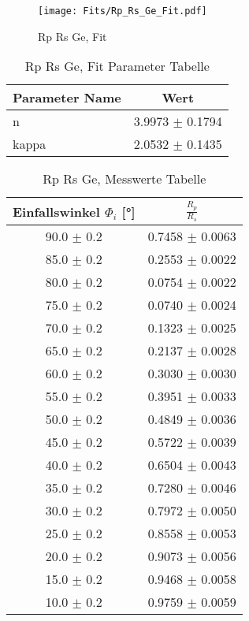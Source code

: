 \begin{figure}[ht] 
 	\centering 
 	\texttt{[image: Fits/Rp\_Rs\_Ge\_Fit.pdf]} 
	\caption{Rp Rs Ge, Fit} 
 	\label{fig:Rp Rs Ge, Fit} 
\end{figure}
 
\begin{table}[ht] 
	\centering 
	\caption{Rp Rs Ge, Fit Parameter Tabelle} 
	\label{tab: Rp Rs Ge, Fit Parameter Tabelle}
	\begin{tabular}{|l|c|}
		\hline
		Parameter Name	&	Wert \\ \hline
		n	&	 3.9973 $\pm$  0.1794\\ \hline
		kappa	&	 2.0532 $\pm$  0.1435\\ \hline
	\end{tabular} 
\end{table}
 
\begin{table}[ht] 
	\centering 
	\caption{Rp Rs Ge, Messwerte Tabelle} 
	\label{tab: Rp Rs Ge, Messwerte Tabelle}
	\begin{tabular}{|c|c|}
		\hline
		Einfallswinkel $\Phi_i$ [°] 	&	 $\frac{R_p}{R_s}$\\ \hline
		90.0 $\pm$ 0.2 	&	 0.7458 $\pm$ 0.0063 \\ \hline
		85.0 $\pm$ 0.2 	&	 0.2553 $\pm$ 0.0022 \\ \hline
		80.0 $\pm$ 0.2 	&	 0.0754 $\pm$ 0.0022 \\ \hline
		75.0 $\pm$ 0.2 	&	 0.0740 $\pm$ 0.0024 \\ \hline
		70.0 $\pm$ 0.2 	&	 0.1323 $\pm$ 0.0025 \\ \hline
		65.0 $\pm$ 0.2 	&	 0.2137 $\pm$ 0.0028 \\ \hline
		60.0 $\pm$ 0.2 	&	 0.3030 $\pm$ 0.0030 \\ \hline
		55.0 $\pm$ 0.2 	&	 0.3951 $\pm$ 0.0033 \\ \hline
		50.0 $\pm$ 0.2 	&	 0.4849 $\pm$ 0.0036 \\ \hline
		45.0 $\pm$ 0.2 	&	 0.5722 $\pm$ 0.0039 \\ \hline
		40.0 $\pm$ 0.2 	&	 0.6504 $\pm$ 0.0043 \\ \hline
		35.0 $\pm$ 0.2 	&	 0.7280 $\pm$ 0.0046 \\ \hline
		30.0 $\pm$ 0.2 	&	 0.7972 $\pm$ 0.0050 \\ \hline
		25.0 $\pm$ 0.2 	&	 0.8558 $\pm$ 0.0053 \\ \hline
		20.0 $\pm$ 0.2 	&	 0.9073 $\pm$ 0.0056 \\ \hline
		15.0 $\pm$ 0.2 	&	 0.9468 $\pm$ 0.0058 \\ \hline
		10.0 $\pm$ 0.2 	&	 0.9759 $\pm$ 0.0059 \\ \hline
	\end{tabular} 
\end{table}
 
